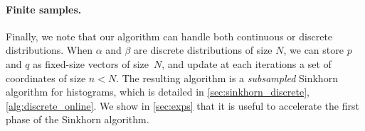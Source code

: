 

\paragraph{Finite samples.}Finally, we note that our algorithm
can handle both continuous or discrete distributions. When $\alpha$ and $\beta$
are discrete distributions of size $N$, we can store $p$ and $q$ as fixed-size
vectors of size~$N$, and update at each iterations a set of coordinates of size $n < N$. The resulting
algorithm is a \textit{subsampled} Sinkhorn algorithm for histograms, which is
detailed in \autoref{sec:sinkhorn_discrete}, \autoref{alg:discrete_online}. We show in \autoref{sec:exps} that it
is useful to accelerate the first phase of the Sinkhorn algorithm.